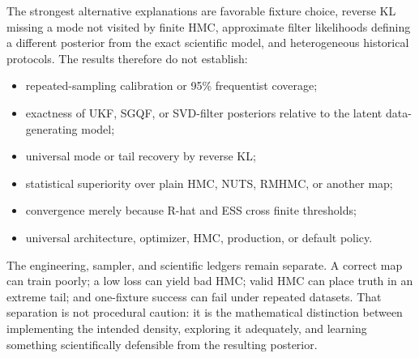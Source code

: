 The strongest alternative explanations are favorable fixture choice, reverse
KL missing a mode not visited by finite HMC, approximate filter likelihoods
defining a different posterior from the exact scientific model, and
heterogeneous historical protocols.  The results therefore do not establish:
\begin{itemize}
 \item repeated-sampling calibration or 95\% frequentist coverage;
 \item exactness of UKF, SGQF, or SVD-filter posteriors relative to the latent
 data-generating model;
 \item universal mode or tail recovery by reverse KL;
 \item statistical superiority over plain HMC, NUTS, RMHMC, or another map;
 \item convergence merely because R-hat and ESS cross finite thresholds;
 \item universal architecture, optimizer, HMC, production, or default policy.
\end{itemize}

The engineering, sampler, and scientific ledgers remain separate.  A correct
map can train poorly; a low loss can yield bad HMC; valid HMC can place truth
in an extreme tail; and one-fixture success can fail under repeated datasets.
That separation is not procedural caution: it is the mathematical distinction
between implementing the intended density, exploring it adequately, and
learning something scientifically defensible from the resulting posterior.
